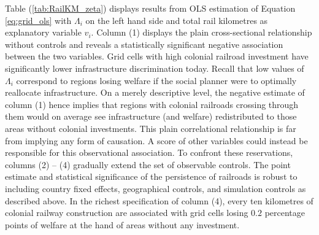 \documentclass[11pt, oneside]{article}   	%
\let\oldref\ref
\renewcommand{\ref}[1]{(\oldref{#1})}
\begin{document}
Table \ref{tab:RailKM_zeta} displays results from OLS estimation of Equation \eqref{eq:grid_ols} with $\Lambda_{i}$ on the left hand side and total rail kilometres as explanatory variable $v_{i}$. Column (1) displays the plain cross-sectional relationship without controls and reveals a statistically significant negative association between the two variables. Grid cells with high colonial railroad investment have significantly lower infrastructure discrimination today. Recall that low values of $\Lambda_{i}$ correspond to regions losing welfare if the social planner were to optimally reallocate infrastructure. On a merely descriptive level, the negative estimate of column (1) hence implies that regions with colonial railroads crossing through them would on average see infrastructure (and welfare) redistributed to those areas without colonial investments. This plain correlational relationship is far from implying any form of causation. A score of other variables could instead be responsible for this observational association. To confront these reservations, columns (2) -- (4) gradually extend the set of observable controls. The point estimate and statistical significance of the persistence of railroads is robust to including country fixed effects, geographical controls, and simulation controls as described above. In the richest specification of column (4), every ten kilometres of colonial railway construction are associated with grid cells losing $0.2$ percentage points of welfare at the hand of areas without any investment.
\end{document}
